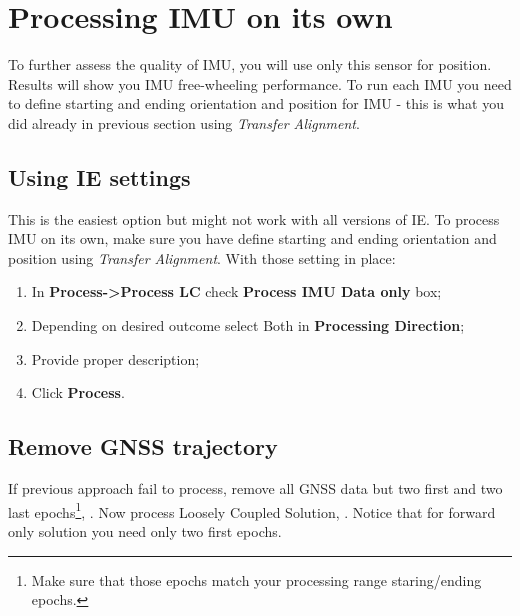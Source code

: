 \documentclass[11pt,fleqn]{book} %
\begin{document}
\chapter{Processing IMU on its own}\label{Processing-IMU-on-its-own}

To further assess the quality of IMU, you will use only this sensor for position. Results will show you IMU free-wheeling performance. To run each IMU you need to define starting and ending orientation and position for IMU - this is what you did already in previous section using \emph{Transfer Alignment}.

\section{Using IE settings}

This is the easiest option but might not work with all versions of IE. To process IMU on its own, make sure you have define starting and ending orientation and position using \emph{Transfer Alignment}. With those setting in place:

\begin{enumerate}
	\item In \textbf{Process->Process LC} check \textbf{Process IMU Data only} box;
	\item Depending on desired outcome select Both in \textbf{Processing Direction};
	\item Provide proper description;
	\item Click \textbf{Process}.
\end{enumerate}


\section{Remove GNSS trajectory}

If previous approach fail to process, remove all GNSS data but two first and two last epochs\footnote{Make sure that those epochs match your processing range staring/ending epochs.}, . Now process Loosely Coupled Solution, . Notice that for forward only solution you need only two first epochs.
\end{document}
